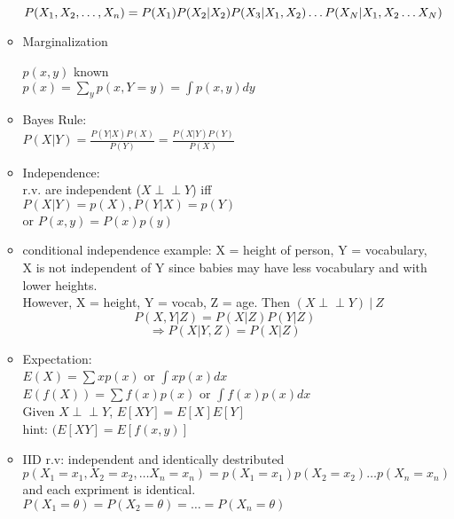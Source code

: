 \documentclass[12pt]{article}
\newcommand{\indep}{\perp \!\!\! \perp}
\begin{document}
\begin{multicols}{2}
\begin{enumerate}
\begin{itemize}
                $P(X_1, X_2, \dots, X_n) = P(X_1)P(X_2|X_2)P(X_3|X_1,X_2)\\ \dots P(X_N|X_1,X_2 \dots X_N) $

                \item Marginalization
                
                $p(x,y)$ known\\
                $p(x) = \sum\limits_y p(x, Y= y) = \int p(x,y)dy$  

                \item Bayes Rule:\\
                $P(X|Y) = \frac{P(Y|X)P(X)}{P(Y)} = \frac{P(X|Y)P(Y)}{P(X)} $

                \item Independence: \\
                r.v. are independent ($X\indep Y$) iff \\
                $P(X|Y) = p(X), P(Y|X) = p(Y)$
                \\or $P(x,y) =P(x)p(y)$
                \item conditional independence
                example: X = height of person, Y = vocabulary, X is not independent of Y since babies may have less vocabulary and with lower heights.\\
                However, X = height, Y = vocab, Z = age. Then $(X\indep Y)\ | \ Z$
                $$P(X,Y|Z) = P(X|Z)P(Y|Z)$$
                $$\Rightarrow P(X|Y, Z) = P(X|Z)$$

                \item Expectation:\\
                $E(X) = \sum xp(x) $ or $\int xp(x)dx$\\
                $E(f(X)) = \sum f(x)p(x)$ or $\int f(x)p(x)dx$\\
                Given $X\indep Y$, $E[XY] = E[X]E[Y] $ \\
                hint: $(E[XY] = E[f(x,y)]$

                \item IID r.v: independent and identically destributed\\
                $p(X_1= x_1, X_2 = x_2, \dots X_n = x_n) = p(X_1 = x_1)p(X_2 = x_2)\dots p(X_n = x_n)$ and each expriment is identical.\\ $P(X_1 = \theta) = P(X_2 = \theta) = \dots = P(X_n = \theta)$
            \end{itemize}
        \end{enumerate}

        \newpage
    \end{multicols}

    \newpage
    
\end{document}

